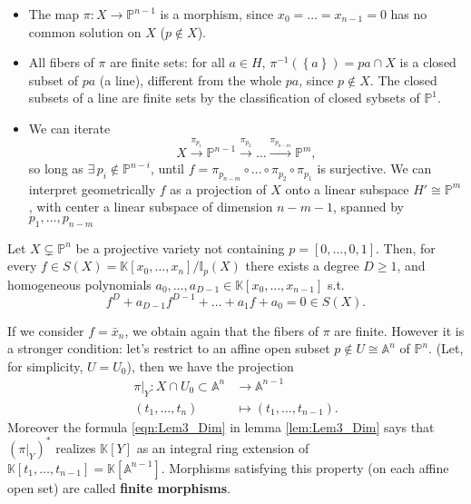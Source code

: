 \begin{rem}[]\leavevmode\vspace{-.2\baselineskip}
	\begin{itemize}
		\item The map $\pi: X \to \mathbb{P}^{n-1}$ is a morphism, since $x_0 = \ldots = x_{n-1} = 0$
			has no common solution on $X$ ($p \not\in X$).
		\item All fibers of $\pi$ are finite sets:
			for all $a \in H$, $\pi^{-1}\left( \left\{ a \right\} \right) = pa \cap X$ is a closed subset of
			$pa$ (a line), different from the whole $pa$, since $p \not\in X$.
			The closed subsets of a line are finite sets by the classification of closed sybsets of $\mathbb{P}^{1}$.
		\item We can iterate
			\begin{equation}
			X \xrightarrow{\pi_{p_1}} \mathbb{P}^{n-1} \xrightarrow{\pi_{p_2}} 
			\ldots \xrightarrow{\pi_{p_{n-m}}} \mathbb{P}^{m}
			,\end{equation} 
			so long as $\exists\, p_i \not\in \mathbb{P}^{n-i}$, until
			$f = \pi_{p_{n-m}} \circ \ldots \circ\pi_{p_2} \circ \pi_{p_1}$ is surjective.
			We can interpret geometrically $f$ as a projection of $X$ onto a linear subspace
			$H' \cong \mathbb{P}^{m}$, with center a linear subspace of dimension $n-m-1$,
			spanned by $p_1, \ldots, p_{n-m}$
	\end{itemize}
\end{rem}

\begin{lem}\label{lem:Lem3_Dim}
	Let $X \subsetneq \mathbb{P}^{n}$ be a projective variety not containing $p = \left[ 0 , \ldots , 0, 1 \right]$.
	Then, for every $f \in S(X) = \mathbb{K}\left[x_0, \ldots, x_n \right]/\mathbb{I}_p(X)$
	there exists a degree $D \geq 1$, and homogeneous polynomials
	$a_0, \ldots, a_{D-1} \in \mathbb{K}\left[x_0, \ldots, x_{n-1} \right]$ s.t.
	\begin{equation}\label{eqn:Lem3_Dim}
		f^D + a_{D-1} f^{D-1} + \ldots + a_1 f + a_0 = 0 \in S(X)
	.\end{equation} 
\end{lem} 
\begin{rem}[]
	If we consider $f = \bar{x}_n$, we obtain again that the fibers of $\pi$ are finite.
	However it is a stronger condition: let's restrict to an affine open subset $p \not \in U \cong \mathbb{A}^{n}$ of $\mathbb{P}^{n}$.
	(Let, for simplicity, $U = U_0$), then we have the projection
	\begin{align}
		\left.\pi\right|_{Y}: X \cap U_0 \subset \mathbb{A}^{n} &\to \mathbb{A}^{n-1} \\
		\left( t_1, \ldots, t_n \right) &\mapsto \left( t_1, \ldots, t_{n-1} \right)
	.\end{align} 
	Moreover the formula \eqref{eqn:Lem3_Dim} in lemma \ref{lem:Lem3_Dim}
	says that $\left( \left.\pi\right|_{Y} \right)^*$ realizes $\mathbb{K}[Y]$
	as an integral ring extension of $\mathbb{K}\left[t_1, \ldots, t_{n-1} \right] = \mathbb{K}[\mathbb{A}^{n-1}]$.
	Morphisms satisfying this property (on each affine open set) are called \textbf{finite morphisms}.
\end{rem}

